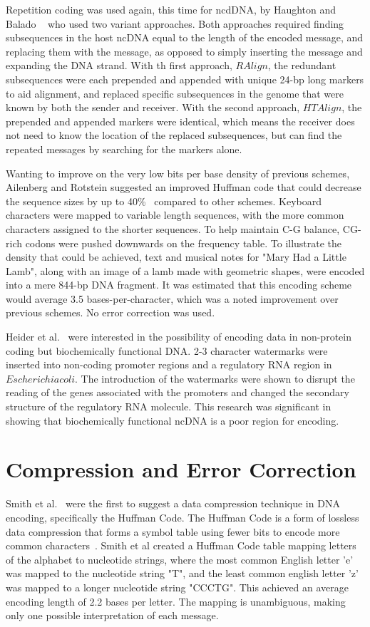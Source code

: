 \documentclass[USenglish,oneside,twocolumn]{article}
\begin{document}
Repetition coding was used again, this time for ncdDNA, by Haughton and Balado ~\cite{HB2011IEEEICOBAB} who used two variant approaches. Both approaches required finding subsequences in the host ncDNA equal to the length of the encoded message, and replacing them with the message, as opposed to simply inserting the message and expanding the DNA strand. With th first approach, $RAlign$, the redundant subsequences were each prepended and appended with unique 24-bp long markers to aid alignment, and replaced specific subsequences in the genome that were known by both the sender and receiver. With the second approach, $HTAlign$, the prepended and appended markers were identical, which means the receiver does not need to know the location of the replaced subsequences, but can find the repeated messages by searching for the markers alone.

Wanting to improve on the very low bits per base density of previous schemes, Ailenberg and Rotstein suggested an improved Huffman code that could decrease the sequence sizes by up to 40\%~\cite{AR2009BT} compared to other schemes. Keyboard characters were mapped to variable length sequences, with the more common characters assigned to the shorter sequences. To help maintain C-G balance, CG-rich codons were pushed downwards on the frequency table. To illustrate the density that could be achieved, text and musical notes for "Mary Had a Little Lamb", along with an image of a lamb made with geometric shapes, were encoded into a mere 844-bp DNA fragment. It was estimated that this encoding scheme would average 3.5 bases-per-character, which was a noted improvement over previous schemes. No error correction was used.

Heider et al.~\cite{HPB2009BMCRN} were interested in the possibility of encoding data in non-protein coding but biochemically functional DNA. 2-3 character watermarks were inserted into non-coding promoter regions and a regulatory RNA region in $Escherichia coli$. The introduction of the watermarks were shown to disrupt the reading of the genes associated with the promoters and changed the secondary structure of the regulatory RNA molecule. This research was significant in showing that biochemically functional ncDNA is a poor region for encoding.


\section{Compression and Error Correction}

Smith et al.~\cite{SFHC2003BL} were the first to suggest a data compression technique in DNA encoding, specifically the Huffman Code. The Huffman Code is a form of lossless data compression that forms a symbol table using fewer bits to encode more common characters~\cite{H1952POTIRE}. Smith et al created a Huffman Code table mapping letters of the alphabet to nucleotide strings, where the most common English letter 'e' was mapped to the nucleotide string "T", and the least common english letter 'z' was mapped to a longer nucleotide string "CCCTG". This achieved an average encoding length of 2.2 bases per letter. The mapping is unambiguous, making only one possible interpretation of each message.
\end{document}
